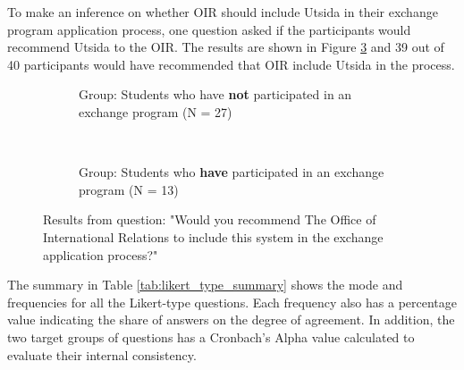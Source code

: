 \FloatBarrier


To make an inference on whether OIR should include Utsida in their exchange program application process, one question asked if the participants would recommend Utsida to the OIR. The results are shown in Figure \ref{fig:office_recommendation} and 39 out of 40 participants would have recommended that OIR include Utsida in the process. 

\FloatBarrier

\begin{figure}[h]
    \centering
    \begin{subfigure}[b]{0.4\textwidth}
        
        \caption{Group: Students who have \textbf{not} participated in an exchange program (N = 27)}
        \label{fig:office_recommendation_p1}
    \end{subfigure}
    ~ \qquad %
    \begin{subfigure}[b]{0.4\textwidth}
       
        \caption{Group: Students who \textbf{have} participated in an exchange program (N = 13)}
        \label{fig:office_recommendation_p2}
    \end{subfigure}
    \caption[Result from question on recommendation to OIR]{Results from question: "Would you recommend The Office of International Relations to include this system in the exchange application process?"}
    \label{fig:office_recommendation}
\end{figure}


\FloatBarrier

The summary in Table \ref{tab:likert_type_summary} shows the mode and frequencies for all the Likert-type questions. Each frequency also has a percentage value indicating the share of answers on the degree of agreement. In addition, the two target groups of questions has a Cronbach's Alpha value calculated to evaluate their internal consistency.


